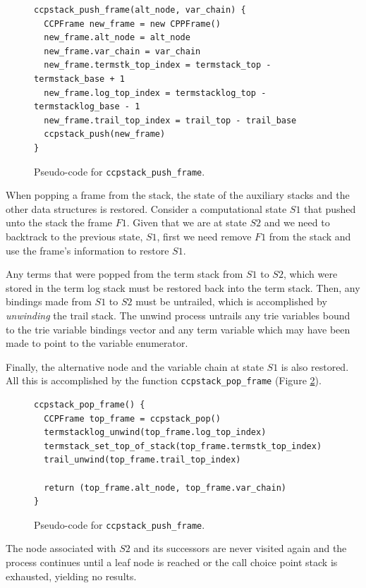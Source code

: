 \begin{figure}[ht]
\begin{Verbatim}
ccpstack_push_frame(alt_node, var_chain) {
  CCPFrame new_frame = new CPPFrame()
  new_frame.alt_node = alt_node
  new_frame.var_chain = var_chain
  new_frame.termstk_top_index = termstack_top - termstack_base + 1
  new_frame.log_top_index = termstacklog_top - termstacklog_base - 1
  new_frame.trail_top_index = trail_top - trail_base
  ccpstack_push(new_frame)
}
\end{Verbatim}
\caption{Pseudo-code for \texttt{ccpstack\_push\_frame}.}
\label{fig:ccpstack_push_frame}
\end{figure}

When popping a frame from the stack, the state of the auxiliary stacks and the other data
structures is restored. Consider a computational state $S1$ that pushed unto the stack
the frame $F1$. Given that we are at state $S2$ and we need to backtrack to the previous state, $S1$,
first we need remove $F1$ from the stack and use the frame's information to restore $S1$.

Any terms that were popped from the term stack from $S1$ to $S2$, which were
stored in the term log stack must be restored back into the term stack.
Then, any bindings made from $S1$ to $S2$ must be untrailed, which is
accomplished by \textit{unwinding} the trail stack. The unwind process untrails
any trie variables bound to the trie variable bindings vector
and any term variable which may have been made to point to the variable enumerator. 

Finally, the alternative node and
the variable chain at state $S1$ is also restored. All this is accomplished by the
function \texttt{ccpstack\_pop\_frame} (Figure \ref{fig:ccpstack_pop_frame}).

\begin{figure}[ht]
\begin{Verbatim}
ccpstack_pop_frame() {
  CCPFrame top_frame = ccpstack_pop()
  termstacklog_unwind(top_frame.log_top_index)
  termstack_set_top_of_stack(top_frame.termstk_top_index)
  trail_unwind(top_frame.trail_top_index)
  
  return (top_frame.alt_node, top_frame.var_chain)
}
\end{Verbatim}
\caption{Pseudo-code for \texttt{ccpstack\_push\_frame}.}
\label{fig:ccpstack_pop_frame}
\end{figure}

The node associated with $S2$ and its successors are never visited again and
the process continues until a leaf node is reached or the call choice point stack
is exhausted, yielding no results.

